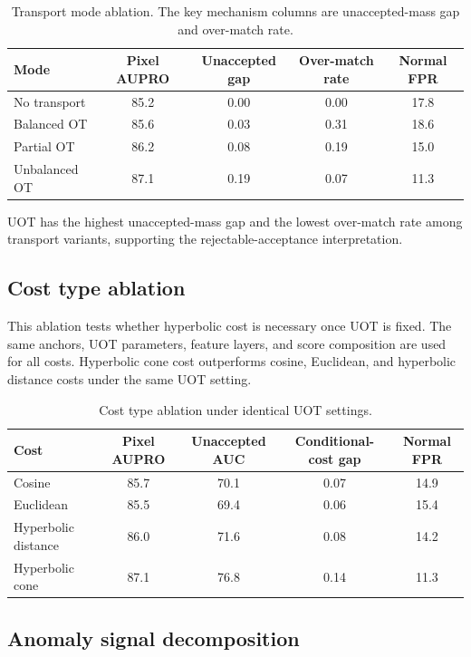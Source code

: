 \documentclass[10pt]{article}
\begin{document}
\begin{table}[t]
\centering
\caption{Transport mode ablation. The key mechanism columns are unaccepted-mass gap and over-match rate.}
\label{tab:transport}
\begin{tabular}{lcccc}
\toprule
Mode & Pixel AUPRO & Unaccepted gap & Over-match rate & Normal FPR \\
\midrule
No transport & 85.2 & 0.00 & 0.00 & 17.8 \\
Balanced OT & 85.6 & 0.03 & 0.31 & 18.6 \\
Partial OT & 86.2 & 0.08 & 0.19 & 15.0 \\
Unbalanced OT & 87.1 & 0.19 & 0.07 & 11.3 \\
\bottomrule
\end{tabular}
\end{table}

UOT has the highest unaccepted-mass gap and the lowest over-match rate among transport variants, supporting the rejectable-acceptance interpretation.

\subsection{Cost type ablation}

This ablation tests whether hyperbolic cost is necessary once UOT is fixed.
The same anchors, UOT parameters, feature layers, and score composition are used for all costs.
Hyperbolic cone cost outperforms cosine, Euclidean, and hyperbolic distance costs under the same UOT setting.

\begin{table}[t]
\centering
\caption{Cost type ablation under identical UOT settings.}
\label{tab:cost}
\begin{tabular}{lcccc}
\toprule
Cost & Pixel AUPRO & Unaccepted AUC & Conditional-cost gap & Normal FPR \\
\midrule
Cosine & 85.7 & 70.1 & 0.07 & 14.9 \\
Euclidean & 85.5 & 69.4 & 0.06 & 15.4 \\
Hyperbolic distance & 86.0 & 71.6 & 0.08 & 14.2 \\
Hyperbolic cone & 87.1 & 76.8 & 0.14 & 11.3 \\
\bottomrule
\end{tabular}
\end{table}

\subsection{Anomaly signal decomposition}
\end{document}
